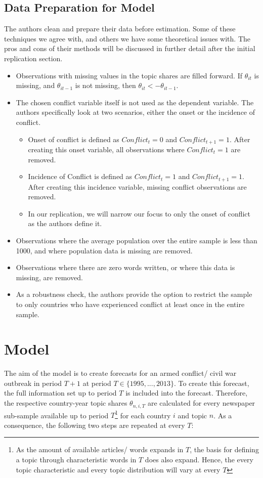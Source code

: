 \subsection{Data Preparation for Model} \label{data_prep}
The authors clean and prepare their data before estimation.
Some of these techniques we agree with, and others we have some theoretical issues with.
The pros and cons of their methods will be discussed in further detail after the initial replication section.

\begin{itemize}
    \item Observations with missing values in the topic shares are filled forward. If $\theta_{it}$ is missing, and $\theta_{it - 1}$ is not missing, then $\theta_{it} <- \theta_{it - 1}.$
    \item The chosen conflict variable itself is not used as the dependent variable. The authors specifically look at two scenarios, either the onset or the incidence of conflict.
        \begin{itemize}
            \item Onset of conflict is defined as $Conflict_{t} = 0$ and $Conflict_{t + 1} = 1$. After creating this onset variable, all observations where $Conflict_{t} = 1$ are removed.
            \item Incidence of Conflict is defined as $Conflict_{t} = 1$ and $Conflict_{t + 1} = 1$. After creating this incidence variable, missing conflict observations are removed.
            \item In our replication, we will narrow our focus to only the onset of conflict as the authors define it.
        \end{itemize}
    \item Observations where the average population over the entire sample is less than 1000, and where population data is missing are removed.
    \item Observations where there are zero words written, or where this data is missing, are removed.
    \item As a robustness check, the authors provide the option to restrict the sample to only countries who have experienced conflict at least once in the entire sample.
\end{itemize}

\section{Model}
The aim of the model is to create forecasts for an armed conflict/ civil war outbreak in period $T+1$ at period $T \in \{1995,..., 2013\}$.
To create this forecast, the full information set up to period $T$ is included into the forecast.
Therefore, the respective country-year topic shares $\theta_{n,i,T}$ are calculated for every newspaper sub-sample available up to period $T$\footnote{As the amount of available articles/ words expands in $T$, the basis for defining a topic through characteristic words in $T$ does also expand. Hence, the every topic characteristic and every topic distribution will vary at every $T$} for each country $i$ and topic $n$.
As a consequence, the following two steps are repeated at every $T$:

